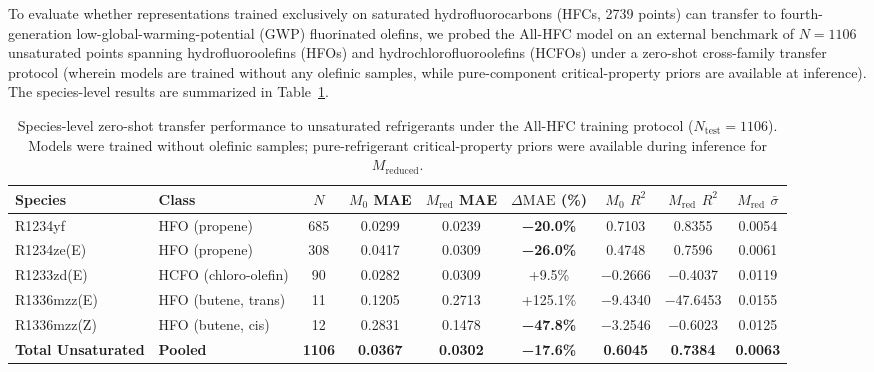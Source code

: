 To evaluate whether representations trained exclusively on saturated hydrofluorocarbons (HFCs, 2739 points) can transfer to fourth-generation low-global-warming-potential (GWP) fluorinated olefins, we probed the All-HFC model on an external benchmark of $N=1106$ unsaturated points spanning hydrofluoroolefins (HFOs) and hydrochlorofluoroolefins (HCFOs) under a zero-shot cross-family transfer protocol (wherein models are trained without any olefinic samples, while pure-component critical-property priors are available at inference). The species-level results are summarized in Table~\ref{tab:unsat_species}.

\begin{table}[htbp]
\centering
\small
\caption{Species-level zero-shot transfer performance to unsaturated refrigerants under the All-HFC training protocol ($N_{\mathrm{test}}=1106$). Models were trained without olefinic samples; pure-refrigerant critical-property priors were available during inference for $M_{\mathrm{reduced}}$.}
\label{tab:unsat_species}
\begin{tabular}{llccccccc}
\toprule
\textbf{Species} & \textbf{Class} & \textbf{$N$} & \textbf{$M_0$ MAE} & \textbf{$M_{\mathrm{red}}$ MAE} & \textbf{$\Delta\text{MAE}$ (\%)} & \textbf{$M_0$ $R^2$} & \textbf{$M_{\mathrm{red}}$ $R^2$} & \textbf{$M_{\mathrm{red}}$ $\bar{\sigma}$} \\
\midrule
R1234yf & HFO (propene) & 685 & 0.0299 & 0.0239 & \textbf{−20.0\%} & 0.7103 & 0.8355 & 0.0054 \\
R1234ze(E) & HFO (propene) & 308 & 0.0417 & 0.0309 & \textbf{−26.0\%} & 0.4748 & 0.7596 & 0.0061 \\
R1233zd(E) & HCFO (chloro-olefin) & 90 & 0.0282 & 0.0309 & +9.5\% & −0.2666 & −0.4037 & 0.0119 \\
R1336mzz(E) & HFO (butene, trans) & 11 & 0.1205 & 0.2713 & +125.1\% & −9.4340 & −47.6453 & 0.0155 \\
R1336mzz(Z) & HFO (butene, cis) & 12 & 0.2831 & 0.1478 & \textbf{−47.8\%} & −3.2546 & −0.6023 & 0.0125 \\
\midrule
\textbf{Total Unsaturated} & \textbf{Pooled} & \textbf{1106} & \textbf{0.0367} & \textbf{0.0302} & \textbf{−17.6\%} & \textbf{0.6045} & \textbf{0.7384} & \textbf{0.0063} \\
\bottomrule
\end{tabular}
\end{table}

